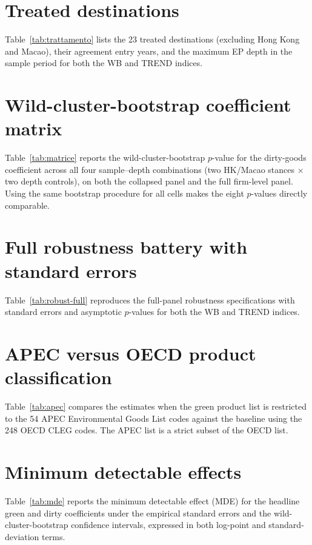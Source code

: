 \documentclass[12pt]{article}
\begin{document}
\section{Treated destinations}\label{app:trattamento}

Table~\ref{tab:trattamento} lists the 23 treated destinations (excluding Hong Kong and Macao), their agreement entry years, and the maximum EP depth in the sample period for both the WB and TREND indices.



\section{Wild-cluster-bootstrap coefficient matrix}\label{app:matrice}

Table~\ref{tab:matrice} reports the wild-cluster-bootstrap $p$-value for the dirty-goods coefficient across all four sample--depth combinations (two HK/Macao stances $\times$ two depth controls), on both the collapsed panel and the full firm-level panel. Using the same bootstrap procedure for all cells makes the eight $p$-values directly comparable.



\section{Full robustness battery with standard errors}\label{app:robustfull}

Table~\ref{tab:robust-full} reproduces the full-panel robustness specifications with standard errors and asymptotic $p$-values for both the WB and TREND indices.



\section{APEC versus OECD product classification}\label{app:apec}

Table~\ref{tab:apec} compares the estimates when the green product list is restricted to the 54 APEC Environmental Goods List codes \citep{sauvage2014} against the baseline using the 248 OECD CLEG codes. The APEC list is a strict subset of the OECD list.



\section{Minimum detectable effects}\label{app:mde}

Table~\ref{tab:mde} reports the minimum detectable effect (MDE) for the headline green and dirty coefficients under the empirical standard errors and the wild-cluster-bootstrap confidence intervals, expressed in both log-point and standard-deviation terms.


\end{document}
